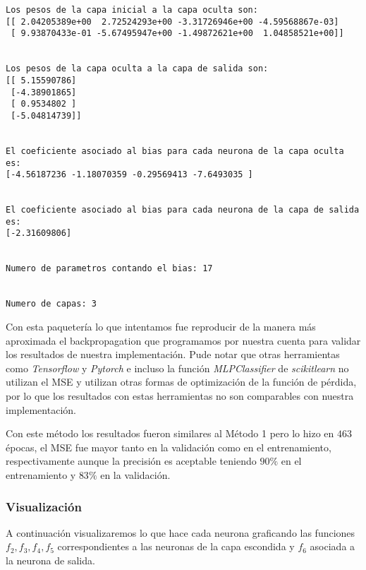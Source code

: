 \documentclass[11pt]{article}
\begin{document}
    \begin{Verbatim}[commandchars=\\\{\}]
Los pesos de la capa inicial a la capa oculta son:
[[ 2.04205389e+00  2.72524293e+00 -3.31726946e+00 -4.59568867e-03]
 [ 9.93870433e-01 -5.67495947e+00 -1.49872621e+00  1.04858521e+00]]


Los pesos de la capa oculta a la capa de salida son:
[[ 5.15590786]
 [-4.38901865]
 [ 0.9534802 ]
 [-5.04814739]]


El coeficiente asociado al bias para cada neurona de la capa oculta es:
[-4.56187236 -1.18070359 -0.29569413 -7.6493035 ]


El coeficiente asociado al bias para cada neurona de la capa de salida es:
[-2.31609806]


Numero de parametros contando el bias: 17


Numero de capas: 3
    \end{Verbatim}

    Con esta paquetería lo que intentamos fue reproducir de la manera más
aproximada el backpropagation que programamos por nuestra cuenta para
validar los resultados de nuestra implementación. Pude notar que otras
herramientas como \emph{Tensorflow} y \emph{Pytorch} e incluso la
función \emph{MLPClassifier} de \emph{scikitlearn} no utilizan el MSE y
utilizan otras formas de optimización de la función de pérdida, por lo
que los resultados con estas herramientas no son comparables con nuestra
implementación.

Con este método los resultados fueron similares al Método 1 pero lo hizo
en \(463\) épocas, el MSE fue mayor tanto en la validación como en el
entrenamiento, respectivamente aunque la precisión es aceptable teniendo
\(90\%\) en el entrenamiento y \(83\%\) en la validación.

    \hypertarget{visualizaciuxf3n}{%
\subsubsection{Visualización}\label{visualizaciuxf3n}}

    A continuación visualizaremos lo que hace cada neurona graficando las
funciones \(f_2,f_3,f_4,f_5\) correspondientes a las neuronas de la capa
escondida y \(f_6\) asociada a la neurona de salida.
\end{document}
